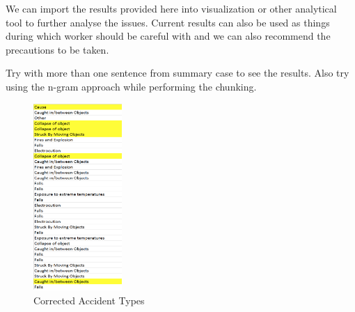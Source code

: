 \documentclass[DIV=calc, paper=a4, fontsize=11pt, twocolumn]{scrartcl}	 %
\begin{document}
We can import the results provided here into visualization or other analytical tool to further analyse the issues.
Current results can also be used as things during which worker should
be careful with and we can also recommend the precautions to be taken.

Try with more than one sentence from summary case to see the results.
Also try using the n-gram approach while performing the chunking.



{}


\begin{appendices}

\begin{figure}[h!]
  \centering
      \includegraphics[width=0.3\textwidth]{app1.png}
  \caption{Corrected Accident Types}
\end{figure}

\end{appendices}

\end{document}
